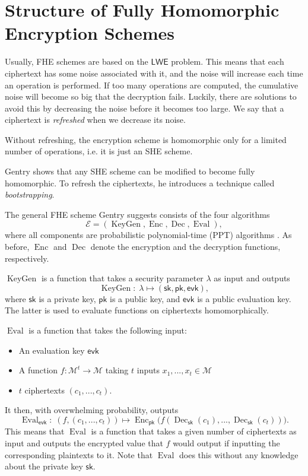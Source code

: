 \section{Structure of Fully Homomorphic Encryption Schemes}

Usually, FHE schemes are based on the $\mathsf{LWE}$ problem. This means that each ciphertext has some noise associated with it, and the noise will increase each time an operation is performed. If too many operations are computed, the cumulative noise will become so big that the decryption fails. Luckily, there are solutions to avoid this by decreasing the noise before it becomes too large. We say that a ciphertext is \textit{refreshed} when we decrease its noise.

Without refreshing, the encryption scheme is homomorphic only for a limited number of operations, i.e. it is just an SHE scheme.

Gentry \cite{cite:gentry1} shows that any SHE scheme can be modified to become fully homomorphic. To refresh the ciphertexts, he introduces a technique called \textit{bootstrapping}.

The general FHE scheme Gentry \cite{cite:gentry1} suggests consists of the four algorithms
$$\mathcal{E} = (\operatorname{KeyGen}, \operatorname{Enc}, \operatorname{Dec}, \operatorname{Eval}),$$
where all components are probabilistic polynomial-time (PPT) algorithms \cite{cite:QianFHE}. As before, $\operatorname{Enc}$ and $\operatorname{Dec}$ denote the encryption and the decryption functions, respectively. %

$\operatorname{KeyGen}$ is a function that takes a security parameter $\lambda$ as input and outputs
$$\operatorname{KeyGen}: \; \lambda \mapsto (\mathsf{sk}, \mathsf{pk}, \mathsf{evk}),$$
where $\mathsf{sk}$ is a private key, $\mathsf{pk}$ is a public key, and $\mathsf{evk}$ is a public evaluation key. The latter is used to evaluate functions on ciphertexts homomorphically.

$\operatorname{Eval}$ is a function that takes the following input:
\begin{itemize}
    \item An evaluation key $\mathsf{evk}$
    \item A function $f: \mathcal{M}^t \to \mathcal{M}$ taking $t$ inputs $x_1, ..., x_t \in \mathcal{M}$
    \item $t$ ciphertexts $(c_1, ..., c_t).$
\end{itemize}
It then, with overwhelming probability, outputs
$$\operatorname{Eval}_{\mathsf{evk}}: \; (f, (c_1, ..., c_t)) \mapsto \operatorname{Enc}_{\mathsf{pk}}\bigl(f(\operatorname{Dec}_{\mathsf{sk}}(c_1), ..., \operatorname{Dec}_{\mathsf{sk}}(c_t))\bigr).$$
This means that $\operatorname{Eval}$ is a function that takes a given number of ciphertexts as input and outputs the encrypted value that $f$ would output if inputting the corresponding plaintexts to it. Note that $\operatorname{Eval}$ does this without any knowledge about the private key $\mathsf{sk}$.

